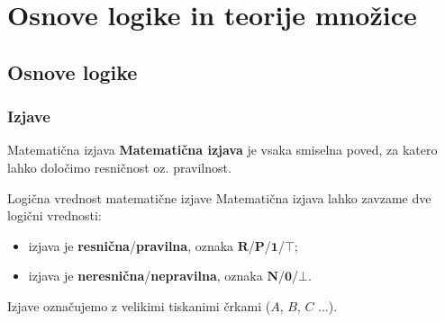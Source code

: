 \section{Osnove logike in teorije množice}

\begin{frame}
    \sectionpage
\end{frame}

\begin{frame}
\end{frame}

    \subsection{Osnove logike}

        \begin{frame}
            \frametitle{Izjave}

            \begin{alertblock}{Matematična izjava}
                \textbf{Matematična izjava} je vsaka smiselna poved, za katero 
                lahko določimo resničnost oz. pravilnost.
            \end{alertblock}

            \begin{alertblock}{Logična vrednost matematične izjave}
                Matematična izjava lahko zavzame dve logični vrednosti:
                \begin{itemize}
                    \item izjava je \textbf{resnična}/\textbf{pravilna}, 
                        oznaka $\mathbf{R}$/$\mathbf{P}$/$\mathbf{1}$/$\mathbf{\top}$;
                    \item izjava je \textbf{neresnična}/\textbf{nepravilna}, 
                        oznaka $\mathbf{N}$/$\mathbf{0}$/$\mathbf{\bot }$.
                \end{itemize}                
            \end{alertblock}

            \begin{alertblock}{}
                Izjave označujemo z velikimi tiskanimi črkami ($A$, $B$, $C$ ...).
            \end{alertblock}
        \end{frame}

